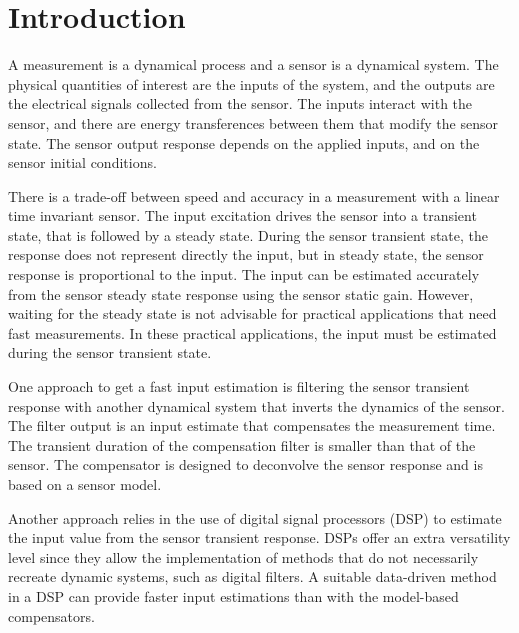 \chapter{Introduction} \label{chap:Introduction}

A measurement is a dynamical process and a sensor is a dynamical system.
The physical quantities of interest are the inputs of the system, and the outputs are the electrical signals collected from the sensor.
The inputs interact with the sensor, and there are energy transferences between them that modify the sensor state.
The sensor output response depends on the applied inputs, and on the sensor initial conditions.

There is a trade-off between speed and accuracy in a measurement with a linear time invariant sensor.
The input excitation drives the sensor into a transient state, that is followed by a steady state.
During the sensor transient state, the response does not represent directly the input, but 
in steady state, the sensor response is proportional to the input.
The input can be estimated accurately from the sensor steady state response using the sensor static gain.
However, waiting for the steady state is not advisable for practical applications that need fast measurements.
In these practical applications, the input must be estimated during the sensor transient state.

One approach to get a fast input estimation is filtering the sensor transient response with another dynamical system that inverts the dynamics of the sensor.
The filter output is an input estimate that compensates the measurement time.
The transient duration of the compensation filter is smaller than that of the sensor.
The compensator is designed to deconvolve the sensor response and is based on a sensor model.

Another approach relies in the use of digital signal processors (DSP) to estimate the input value from the sensor transient response.
DSPs offer an extra versatility level since they allow the implementation of methods that do not necessarily recreate dynamic systems, such as digital filters.
A suitable data-driven method in a DSP can provide faster input estimations than with the model-based compensators.


